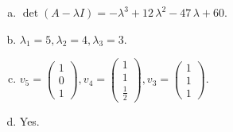 \begin{questions}
\begin{solution}
\begin{enumerate}[(a)]
\item $\det(A-\lambda I)=-{\lambda}^{3} + 12 \, {\lambda}^{2} - 47 \, {\lambda} + 60$.
\item ${\lambda}_1=5, {\lambda}_2=4, {\lambda}_3=3$.
\item $v_{5}=\left(\begin{array}{r}
1 \\
0 \\
1
\end{array}\right), v_{4}=\left(\begin{array}{r}
1 \\
1 \\
\frac{1}{2}
\end{array}\right), v_{3}=\left(\begin{array}{r}
1 \\
1 \\
1
\end{array}\right)$.
\item Yes.
\end{enumerate}
\end{solution}

\end{questions}

\newpage


\begin{center}
\end{center}

